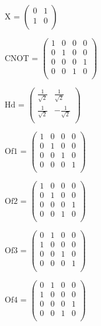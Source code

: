 \noindent\(\text{X}\text{ = }\left(
\begin{array}{cc}
 0 & 1 \\
 1 & 0 \\
\end{array}
\right)\)

\noindent\(\text{CNOT}\text{ = }\left(
\begin{array}{cccc}
 1 & 0 & 0 & 0 \\
 0 & 1 & 0 & 0 \\
 0 & 0 & 0 & 1 \\
 0 & 0 & 1 & 0 \\
\end{array}
\right)\)

\noindent\(\text{Hd}\text{ = }\left(
\begin{array}{cc}
 \frac{1}{\sqrt{2}} & \frac{1}{\sqrt{2}} \\
 \frac{1}{\sqrt{2}} & -\frac{1}{\sqrt{2}} \\
\end{array}
\right)\)

\noindent\(\text{Of1}\text{ = }\left(
\begin{array}{cccc}
 1 & 0 & 0 & 0 \\
 0 & 1 & 0 & 0 \\
 0 & 0 & 1 & 0 \\
 0 & 0 & 0 & 1 \\
\end{array}
\right)\)

\noindent\(\text{Of2}\text{ = }\left(
\begin{array}{cccc}
 1 & 0 & 0 & 0 \\
 0 & 1 & 0 & 0 \\
 0 & 0 & 0 & 1 \\
 0 & 0 & 1 & 0 \\
\end{array}
\right)\)

\noindent\(\text{Of3}\text{ = }\left(
\begin{array}{cccc}
 0 & 1 & 0 & 0 \\
 1 & 0 & 0 & 0 \\
 0 & 0 & 1 & 0 \\
 0 & 0 & 0 & 1 \\
\end{array}
\right)\)

\noindent\(\text{Of4}\text{ = }\left(
\begin{array}{cccc}
 0 & 1 & 0 & 0 \\
 1 & 0 & 0 & 0 \\
 0 & 0 & 0 & 1 \\
 0 & 0 & 1 & 0 \\
\end{array}
\right)\)

